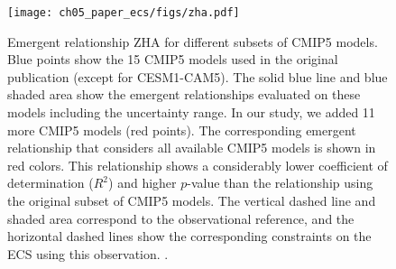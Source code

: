 \begin{figure}[t]
  \centering
  \texttt{[image: ch05\_paper\_ecs/figs/zha.pdf]}
  \caption[
    Emergent relationship ZHA for different subsets of \acs{CMIP}5 models.
  ]{
    Emergent relationship ZHA \autocite{Zhai2015} for different subsets of
    \acs{CMIP}5 models. Blue points show the 15 \acs{CMIP}5 models used in the
    original publication (except for \acs{CESM}1-CAM5). The solid blue line and
    blue shaded area show the emergent relationships evaluated on these models
    including the uncertainty range. In our study, we added 11 more \acs{CMIP}5
    models (red points). The corresponding emergent relationship that considers
    all available \acs{CMIP}5 models is shown in red colors. This relationship
    shows a considerably lower coefficient of determination ($R^2$) and higher
    $p$-value than the relationship using the original subset of \acs{CMIP}5
    models. The vertical dashed line and shaded area correspond to the
    observational reference, and the horizontal dashed lines show the
    corresponding constraints on the \acf{ECS} using this observation.
    .
  }
  \label{fig:05:zha}
\end{figure}

